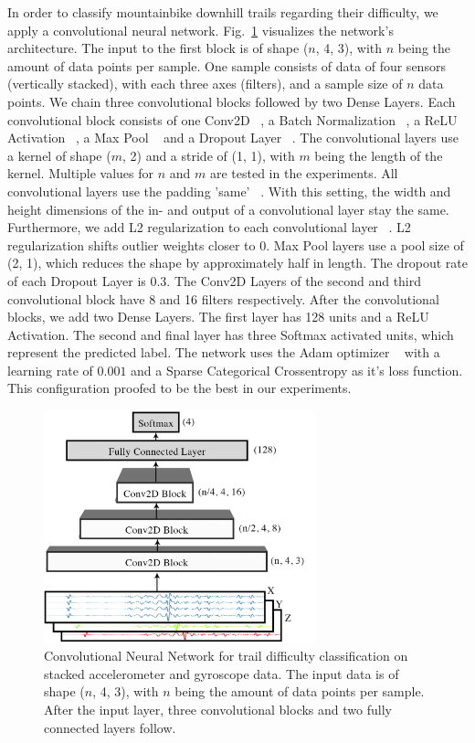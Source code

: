 \documentclass[runningheads]{llncs}
\begin{document}
In order to classify mountainbike downhill trails regarding their difficulty, we apply a convolutional neural network.
Fig.~\ref{fig3} visualizes the network's architecture.
The input to the first block is of shape ($n$, 4, 3), with $n$ being the amount of data points per sample. 
One sample consists of data of four sensors (vertically stacked), with each three axes (filters), and a sample size of $n$ data points.
We chain three convolutional blocks followed by two Dense Layers.
Each convolutional block consists of one Conv2D ~\cite{krizhevsky2012imagenet}, a Batch Normalization ~\cite{ioffe2015batch}, a ReLU Activation ~\cite{hahnloser2000digital}, a Max Pool ~\cite{matsugu2003subject} and a Dropout Layer ~\cite{srivastava2014dropout}.
The convolutional layers use a kernel of shape ($m$, 2) and a stride of (1, 1), with $m$ being the length of the kernel.
Multiple values for $n$ and $m$ are tested in the experiments.
All convolutional layers use the padding 'same' ~\cite{keraspaddingsame}.
With this setting, the width and height dimensions of the in- and output of a convolutional layer stay the same.
Furthermore, we add L2 regularization to each convolutional layer ~\cite{ng2004feature}.
L2 regularization shifts outlier weights closer to 0.
Max Pool layers use a pool size of (2, 1), which reduces the shape by approximately half in length.
The dropout rate of each Dropout Layer is 0.3.
The Conv2D Layers of the second and third convolutional block have 8 and 16 filters respectively.
After the convolutional blocks, we add two Dense Layers. 
The first layer has 128 units and a ReLU Activation.
The second and final layer has three Softmax activated units, which represent the predicted label.
The network uses the Adam optimizer ~\cite{kingma2014adam} with a learning rate of $0.001$ and a Sparse Categorical Crossentropy as it's loss function.
This configuration proofed to be the best in our experiments.

\begin{figure}
\centering 
\includegraphics[width=0.70\textwidth]{network.jpg}
\caption{Convolutional Neural Network for trail difficulty classification on stacked accelerometer and gyroscope data. 
The input data is of shape ($n$, 4, 3), with $n$ being the amount of data points per sample. 
After the input layer, three convolutional blocks and two fully connected layers follow.}
\label{fig3}	
\end{figure}
\end{document}
